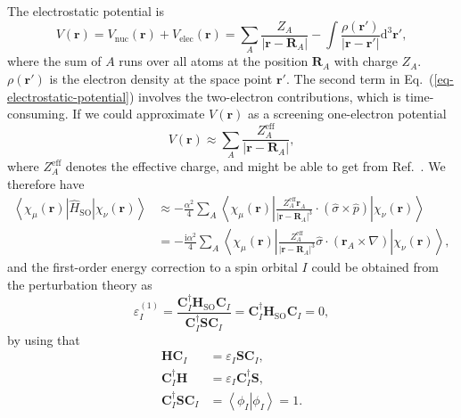 \documentclass[a4paper,11pt,twoside,openright]{book}
\begin{document}
The electrostatic potential is\cite{Volkov-ACA62-400}
\begin{equation}
  \label{eq-electrostatic-potential}
  V(\boldsymbol{r})
    =V_{\text{nuc}}(\boldsymbol{r})+V_{\text{elec}}(\boldsymbol{r})
    =\sum_{A}\frac{Z_{A}}{|\boldsymbol{r}-\boldsymbol{R}_{A}|}%
      -\int\frac{\rho(\boldsymbol{r}')}{|\boldsymbol{r}-\boldsymbol{r}'|}\mathrm{d}^{3}\boldsymbol{r}',
\end{equation}
where the sum of $A$ runs over all atoms at the position $\boldsymbol{R}_{A}$ with charge $Z_{A}$.
$\rho(\boldsymbol{r}')$ is the electron density at the space point $\boldsymbol{r}'$.
The second term in Eq.~(\ref{eq-electrostatic-potential}) involves the two-electron contributions, which
is time-consuming. If we could approximate $V(\boldsymbol{r})$ as a screening one-electron potential
\begin{equation}
  \label{eq-screening-potential}
  V(\boldsymbol{r})\approx\sum_{A}\frac{Z_{A}^{\text{eff}}}{|\boldsymbol{r}-\boldsymbol{R}_{A}|},
\end{equation}
where $Z_{A}^{\text{eff}}$ denotes the effective charge, and might be able to get from Ref.~\cite{Koseki-JPC96-10768}.
We therefore have
\begin{align}
  \left\langle\chi_{\mu}(\boldsymbol{r})\left|\hat{H}_{\text{SO}}\right|\chi_{\nu}(\boldsymbol{r})\right\rangle
  &\approx-\frac{\alpha^{2}}{4}\sum_{A}\left\langle\chi_{\mu}(\boldsymbol{r})\left|%
    \frac{Z_{A}^{\text{eff}}\boldsymbol{r}_{A}}{|\boldsymbol{r}-\boldsymbol{R}_{A}|^{3}}\cdot%
    \left(\hat{\sigma}\times\hat{p}\right)%
    \right|\chi_{\nu}(\boldsymbol{r})\right\rangle\\
  &=-\frac{\text{i}\alpha^{2}}{4}\sum_{A}\left\langle\chi_{\mu}(\boldsymbol{r})\left|%
    \frac{Z_{A}^{\text{eff}}}{|\boldsymbol{r}-\boldsymbol{R}_{A}|^{3}}%
    \hat{\sigma}\cdot\left(\boldsymbol{r}_{A}\times\nabla\right)%
    \right|\chi_{\nu}(\boldsymbol{r})\right\rangle,\nonumber
\end{align}
and the first-order energy correction to a spin orbital $I$ could be obtained from the perturbation theory as
\begin{equation}
  \varepsilon_{I}^{(1)}
  =\frac{\mathbf{C}_{I}^{\dagger}\mathbf{H}_{\text{SO}}\mathbf{C}_{I}}{\mathbf{C}_{I}^{\dagger}\mathbf{S}\mathbf{C}_{I}}
  =\mathbf{C}_{I}^{\dagger}\mathbf{H}_{\text{SO}}\mathbf{C}_{I}=0,
\end{equation}
by using that
\begin{align}
  \mathbf{H}\mathbf{C}_{I}&=\varepsilon_{I}\mathbf{S}\mathbf{C}_{I},\\
  \mathbf{C}_{I}^{\dagger}\mathbf{H}&=\varepsilon_{I}\mathbf{C}_{I}^{\dagger}\mathbf{S},\\
  \mathbf{C}_{I}^{\dagger}\mathbf{S}\mathbf{C}_{I}&=\left\langle\left.\phi_{I}\right|\phi_{I}\right\rangle=1.
\end{align}
\end{document}
